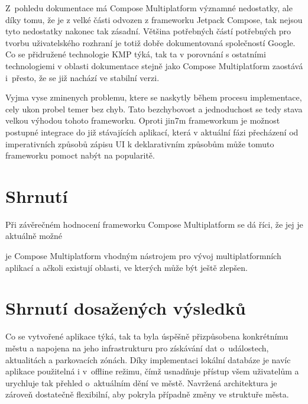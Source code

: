 
Z~pohledu dokumentace má Compose Multiplatform významné nedostatky, ale díky tomu, že je z velké části odvozen z frameworku Jetpack Compose,
tak nejsou tyto nedostatky nakonec tak zásadní. Většina potřebných částí potřebných pro tvorbu uživatelského rozhraní je totiž dobře dokumentovaná 
společností Google. Co se přidružené technologie KMP týká, tak ta v porovnání s ostatními technologiemi v oblasti dokumentace stejně jako Compose 
Multiplatform zaostává i~přesto, že se již nachází ve stabilní verzi.


Vyjma vyse zminenych problemu, ktere se naskytly během procesu implementace, cely ukon probel temer bez chyb. Tato bezchybovost a 
jednoduchost se tedy stava velkou výhodou tohoto frameworku. Oproti jin7m frameworkum je možnost postupné integrace do již stávajících 
aplikací, která v aktuální fázi přecházení od imperativních způsobů zápisu UI k deklarativním způsobům může tomuto frameworku pomoct 
nabýt na popularitě. 


\section*{Shrnutí}
Při závěrečném hodnocení frameworku Compose Multiplatform se dá říci, že jej je aktuálně možné  

je Compose Multiplatform vhodným nástrojem pro vývoj multiplatformních aplikací a ačkoli existují oblasti, ve kterých může být ještě zlepšen.


\section{Shrnutí dosažených výsledků}
Co se vytvořené aplikace týká, tak ta byla úspěšně přizpůsobena konkrétnímu městu a napojena na jeho infrastrukturu pro získávání dat 
o~událostech, aktualitách a parkovacích zónách. Díky implementaci lokální databáze je navíc aplikace použitelná i v~offline režimu, čímž 
usnadňuje přístup všem uživatelům a urychluje tak přehled o~aktuálním dění ve městě. Navržená architektura je zároveň dostatečně flexibilní, 
aby pokryla případně změny ve struktuře města.


